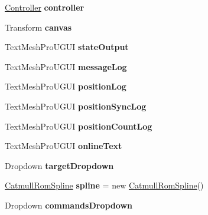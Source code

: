 \begin{DoxyCompactItemize}
\mbox{\hyperlink{class_controller}{Controller}} {\bfseries controller}
\item 
\mbox{\label{class_game_controller_a4849adfdbcb876592dd2ca2c8d3d6dd3}} 
Transform {\bfseries canvas}
\item 
\mbox{\label{class_game_controller_a49eb3e3e0f37bf17509d245d70d53c92}} 
Text\+Mesh\+Pro\+U\+G\+UI {\bfseries state\+Output}
\item 
\mbox{\label{class_game_controller_adf378f165de99cae2e7d1aefda44c9b3}} 
Text\+Mesh\+Pro\+U\+G\+UI {\bfseries message\+Log}
\item 
\mbox{\label{class_game_controller_afa5ed37ed93bb0d81b0672d89003cbd3}} 
Text\+Mesh\+Pro\+U\+G\+UI {\bfseries position\+Log}
\item 
\mbox{\label{class_game_controller_a194cfa82ca88646a0acc5a100a48a537}} 
Text\+Mesh\+Pro\+U\+G\+UI {\bfseries position\+Sync\+Log}
\item 
\mbox{\label{class_game_controller_ad6cb11ae2cdfe0570e0cbb5d6d167d76}} 
Text\+Mesh\+Pro\+U\+G\+UI {\bfseries position\+Count\+Log}
\item 
\mbox{\label{class_game_controller_a6d6429aa7d893d6545ea3b30cf6e0ff1}} 
Text\+Mesh\+Pro\+U\+G\+UI {\bfseries online\+Text}
\item 
\mbox{\label{class_game_controller_aa7b734d3297bbe4c77049973d4dceff2}} 
Dropdown {\bfseries target\+Dropdown}
\item 
\mbox{\label{class_game_controller_a7818b7fb2d36055b1224484016cacf43}} 
\mbox{\hyperlink{class_catmull_rom_spline}{Catmull\+Rom\+Spline}} {\bfseries spline} = new \mbox{\hyperlink{class_catmull_rom_spline}{Catmull\+Rom\+Spline}}()
\item 
\mbox{\label{class_game_controller_a142e03c4d3ffc32238e2110004b8e554}} 
Dropdown {\bfseries commands\+Dropdown}
\item 
\mbox{\label{class_game_controller_a9ef781cf28b98be7c3659652b87fcd32}} 

\end{DoxyCompactItemize}

